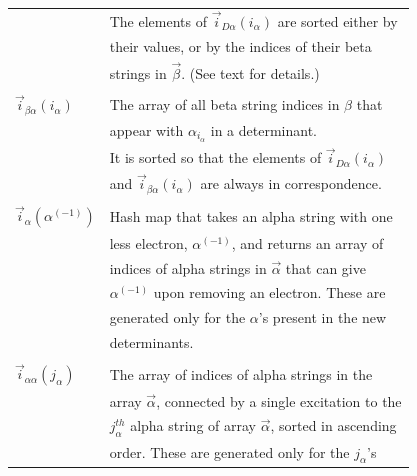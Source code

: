 \documentclass[%
reprint,
 superscriptaddress,
 amsmath,amssymb,
 aps,
]{revtex4-1}
\def\V{\mathcal{V}}
\def\veca{\vec{\alpha}}
\def\vecb{\vec{\beta}}
\def\ia{i_\alpha}
\def\ib{i_\beta}
\def\vecia{\vec{i}_\alpha}
\def\veciDa{\vec{i}_{D\alpha}}
\def\veciaa{\vec{i}_{\alpha\alpha}}
\def\veciba{\vec{i}_{\beta\alpha}}
\begin{document}
\begin{table}[h]
\begin{tabular}{ll}
& The elements of $\veciDa(\ia)$ are sorted either by\\
& their values, or by the indices of their beta \\
& strings in $\vecb$. (See text for details.)\\
&\\
$\veciba(\ia)$ & The array of all beta string indices in $\beta$ that\\
& appear with $\alpha_{\ia}$ in a determinant. \\
& It is sorted so that the elements of $\veciDa(\ia)$ \\
& and $\veciba(\ia)$ are always in correspondence.\\
&\\
$\vecia(\alpha^{(-1)})$ & Hash map that takes an alpha string with one \\
& less electron, $\alpha^{(-1)}$, and returns an array of  \\
& indices of alpha strings in $\veca$ that can give  \\
& $\alpha^{(-1)}$ upon removing an electron.  These are \\
& generated only for the $\alpha$'s present in the new \\
& determinants.\\
&\\
$\veciaa(j_\alpha)$ & The array of indices of alpha strings in the \\
& array $\veca$, connected by a single excitation to the \\
& $j_\alpha^{th}$ alpha string of array $\veca$, sorted in ascending \\
& order. These are generated only for the $j_\alpha$'s \\

\end{tabular}
\end{table}
\end{document}
